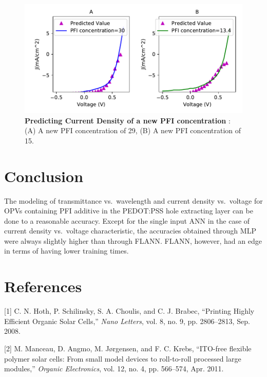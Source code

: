\documentclass[]{article}
\begin{document}
\begin{figure}
\centering
\includegraphics{Report_files/figure-latex/jvflannnew-1.pdf}
\caption{\label{fig:jvflannnew}\textbf{Predicting Current Density of a new PFI concentration }: (A) A new PFI concentration of 29, (B) A new PFI concentration of 15.}
\end{figure}

\hypertarget{conclusion}{%
\section{Conclusion}\label{conclusion}}

The modeling of transmittance vs.~wavelength and current density vs.~voltage for OPVs containing PFI additive in the PEDOT:PSS hole extracting layer can be done to a reasonable accuracy. Except for the single input ANN in the case of current density vs.~voltage characteristic, the accuracies obtained through MLP were always slightly higher than through FLANN. FLANN, however, had an edge in terms of having lower training times.

\newpage

\hypertarget{references}{%
\section{References}\label{references}}


\hypertarget{appendix-appendix}{%
\appendix}


\hypertarget{refs}{}
\leavevmode\hypertarget{ref-Hoth2008}{}%
{[}1{]} C. N. Hoth, P. Schilinsky, S. A. Choulis, and C. J. Brabec, ``Printing Highly Efficient Organic Solar Cells,'' \emph{Nano Letters}, vol. 8, no. 9, pp. 2806--2813, Sep. 2008.

\leavevmode\hypertarget{ref-Manceau2011}{}%
{[}2{]} M. Manceau, D. Angmo, M. Jørgensen, and F. C. Krebs, ``ITO-free flexible polymer solar cells: From small model devices to roll-to-roll processed large modules,'' \emph{Organic Electronics}, vol. 12, no. 4, pp. 566--574, Apr. 2011.
\end{document}
